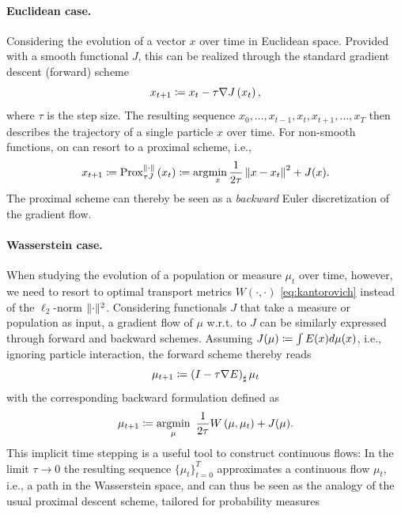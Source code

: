 
\paragraph{Euclidean case.}
Considering the evolution of a vector $x$ over time in Euclidean space. Provided with a smooth functional $J$, this can be realized through the standard gradient descent (forward) scheme
\begin{equation*}
	x_{t+1} \coloneqq x_{t}-\tau \nabla J\left(x_{t}\right),
\end{equation*}
where $\tau$ is the step size. The resulting sequence ${x_0, \dots, x_{t-1}, x_{t}, x_{t+1}, \dots, x_T}$ then describes the trajectory of a single particle $x$ over time.
For non-smooth functions, on can resort to a proximal scheme, i.e.,
\begin{equation*}
	x_{t+1} \coloneqq \operatorname{Prox}_{\tau J}^{\|\cdot\|}\left(x_{t}\right) \coloneqq \arg\!\min_x \frac{1}{2\tau}\left\| x-x_t\right\|^2+ J(x).
\end{equation*}
The proximal scheme can thereby be seen as a \emph{backward} Euler discretization of the gradient flow.

\paragraph{Wasserstein case.}
When studying the evolution of a population or measure $\mu_t$ over time, however, we need to resort to optimal transport metrics $W(\cdot, \cdot)$ \eqref{eq:kantorovich} instead of the $\ell_2$-norm $\lVert\cdot\rVert^2$.
Considering functionals $J$ that take a measure or population as input, a gradient flow of $\mu$ w.r.t. to $J$ can be similarly expressed through forward and backward schemes. Assuming $J(\mu) 
\coloneqq \int E(x) d \mu(x)$, i.e., ignoring particle interaction, the forward scheme thereby reads
\begin{equation*}
	\mu_{t+1}\coloneqq\left(I-\tau \nabla E\right)_{\sharp} \mu_t
\end{equation*}
with the corresponding backward formulation defined as
\begin{equation}
	\label{eq:jko}
	\mu_{t+1}\coloneqq\underset{\mu}{\operatorname{argmin}} \enspace \frac{1}{2\tau}W\left(\mu, \mu_t\right)+ J(\mu).
\end{equation}
This implicit time stepping is a useful tool to construct continuous flows: In the limit $\tau \rightarrow 0$ the resulting sequence $\{\mu_t\}_{t=0}^T$ approximates a continuous flow $\mu_t$, i.e., a path in the Wasserstein space, and can thus be seen as the analogy of the usual proximal descent scheme, tailored for probability measures~\citep[p.285]{santambrogio2015optimal}

